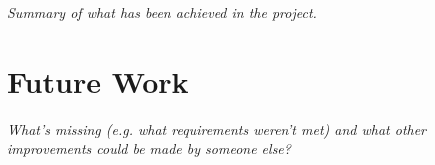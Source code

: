 \documentclass[authoryearcitations]{UoYCSproject}
\begin{document}
\emph{Summary of what has been achieved in the project.}


\section{Future Work}
\label{sec:FutureWork}

\emph{What's missing (e.g. what requirements weren't met) and what other
improvements could be made by someone else?}

\clearpage



\end{document}
